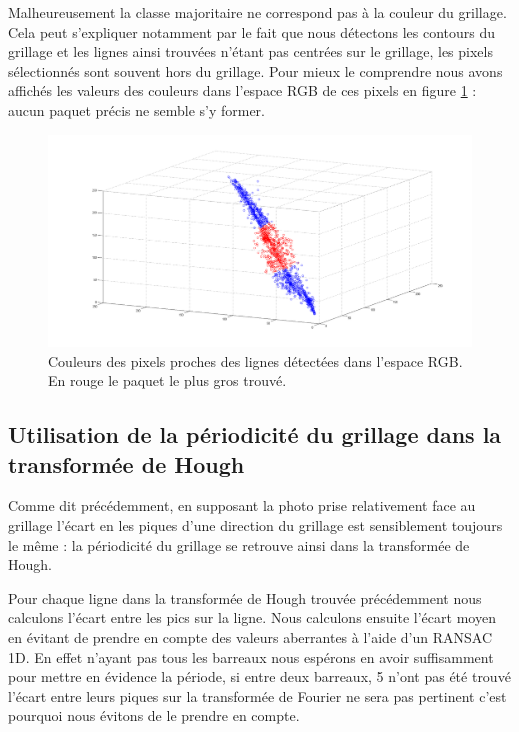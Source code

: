 Malheureusement la classe majoritaire ne correspond pas à la couleur du grillage. Cela peut s'expliquer notamment par le fait que nous détectons les contours du grillage et les lignes ainsi trouvées n'étant pas centrées sur le grillage, les pixels sélectionnés sont souvent hors du grillage. Pour mieux le comprendre nous avons affichés les valeurs des couleurs dans l'espace RGB de ces pixels en figure \ref{Kmeans} : aucun paquet précis ne semble s'y former.

\begin{figure}[h]
\begin{center}
\includegraphics[scale=0.2]{fig/Kmeans.png}
\caption{\label{Kmeans}Couleurs des pixels proches des lignes détectées dans l'espace RGB. En rouge le paquet le plus gros trouvé.}
\end{center}
\end{figure}

\subsection{Utilisation de la périodicité du grillage dans la transformée de Hough}
Comme dit précédemment, en supposant la photo prise relativement face au grillage l'écart en les piques d'une direction du grillage est sensiblement toujours le même : la périodicité du grillage se retrouve ainsi dans la transformée de Hough.

Pour chaque ligne dans la transformée de Hough trouvée précédemment nous calculons l'écart entre les pics sur la ligne. Nous calculons ensuite l'écart moyen en évitant de prendre en compte des valeurs aberrantes à l'aide d'un RANSAC 1D. En effet n'ayant pas tous les barreaux nous espérons en avoir suffisamment pour mettre en évidence la période, si entre deux barreaux, 5 n'ont pas été trouvé l'écart entre leurs piques sur la transformée de Fourier ne sera pas pertinent c'est pourquoi nous évitons de le prendre en compte.

